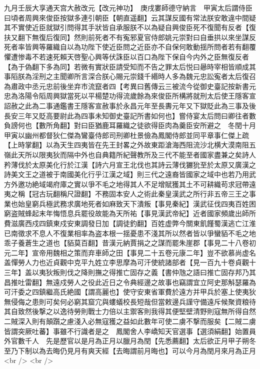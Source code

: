 九月壬辰大享通天宫大赦改元【改元神功】　庚戌婁師德守納言　甲寅太后謂侍臣曰頃者周興來俊臣按獄多連引朝臣【朝直遥翻】云其謀反國有常法朕安敢違中間疑其不實使近臣就獄引問得其手狀皆自承服朕不以為疑自興俊臣死不復聞有反者【復扶又翻下無復后復同】然則前死者不有寃邪夏官侍郎姚元崇對曰自垂拱以來坐謀反死者率皆興等羅織自以為功陛下使近臣問之近臣亦不自保何敢動揺所問者若有翻覆懼遭惨毒不若速死賴天啓聖心興等伏誅臣以百口為陛下保自今内外之臣無復反者【為于偽翻下多為同】若微有實狀臣請受知而不告之罪太后悦曰曏時宰相皆順成其事䧟朕為淫刑之主聞卿所言深合朕心賜元崇錢千緡時人多為魏元忠訟寃者太后復召為肅政中丞元忠前後坐弃市流竄者四【考異曰舊傳云三被流今從御史臺記按新書元忠為洛陽令䧟周興獄當死以平楊楚功得流歲餘為來俊臣所構將就刑太后使王隱客宣詔赦之此為二事通鑑書王隱客宣赦事於永昌元年至長夀元年又下獄貶此為三事及後長安三年又貶高要尉此為四事未知御史臺記所書如何也】嘗侍宴太后問曰卿往者數負謗何也【數所角翻】對曰臣猶鹿耳羅織之徒欲得臣肉為羹臣安所避之　冬閏十月甲寅以幽州都督狄仁傑為鸞臺侍郎司刑卿杜景儉為鳳閣侍郎並同平章事仁傑上疏【上時掌翻】以為天生四夷皆在先王封畧之外故東距滄海西阻流沙北横大漠南阻五嶺此天所以限夷狄而隔中外也自典籍所紀聲教所及三代不能至者國家盡兼之矣詩人矜薄伐於太原美化行於江漢【詩六月宣王北伐也其詩云薄伐玁狁至於太原又廣漢之詩美文王之道被于南國美化行乎江漢之域】則三代之遠裔皆國家之域中也若乃用武方外邀功絶域竭府庫之實以爭不毛之地得其人不足增賦獲其土不可耕織苟求冠帶遠夷之稱【冠古玩翻稱尺證翻】不務固本安人之術此秦皇漢武之所行非五帝三王之事業也始皇窮兵極武務求廣地死者如麻致天下潰叛【事見秦紀】漢武征伐四夷百姓困窮盗賊蜂起末年悔悟息兵罷役故能為天所祐【事見漢武帝紀】近者國家頻歲出師所費滋廣西戍四鎮東戍安東調發日加【調徒釣翻】百姓虚弊今關東飢饉蜀漢逃亡江淮已南徵求不息人不復業相率為盗本根一揺憂患不淺其所以然者皆以爭蠻貊不毛之地乖子養蒼生之道也【貊莫百翻】昔漢元納賈捐之之謀而罷朱崖郡【事見二十八卷初元二年】宣帝用魏相之策而弃車師之田【事見二十五卷元康二年】豈不欲慕尚虚名盖憚勞人力也近貞觀中克平九姓立李思摩為可汗使統諸部者【見一百九十卷貞觀十三年】盖以夷狄叛則伐之降則撫之得推亡固存之義【書仲虺之語曰推亡固存邦乃其昌推吐雷翻】無遠戍勞人之役此近日之令典經邊之故事也竊謂宜立阿史那斛瑟羅為可汗委之四鎮繼高氏絶國【謂高麗也】使守安東省軍費於遠方并甲兵於塞上使夷狄無侵侮之患則可矣何必窮其窟宂與螻蟻校長短哉但當敕邊兵謹守備遠斥候聚資粮待其自致然後撃之以逸待勞則戰士力倍以主禦客則我得其便堅壁清野則寇無所得自然二賊深入則有顛躓之慮淺入必無寇獲之益如此數年可使二虜不撃而服矣【二賊二虜皆謂突厥吐蕃】事雖不行識者是之　鳳閣舍人李嶠知天官選事【選須絹翻】始置員外官數千人　先是歷官以是月為正月以臘月為閏【先悉薦翻】太后欲正月甲子朔冬至乃下制以為去晦仍見月有爽天經【去晦謂前月晦也】可以今月為閏月來月為正月<br />
<br />
